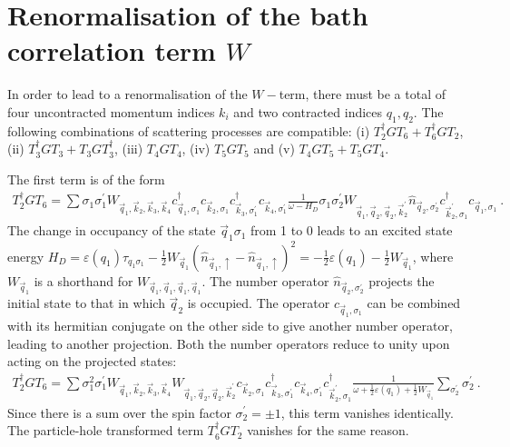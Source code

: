 \documentclass{revtex4-2}
\begin{document}
\section{Renormalisation of the bath correlation term \(W\)}
In order to lead to a renormalisation of the \(W-\)term, there must be a total of four uncontracted momentum indices \(k_i\) and two contracted indices \(q_1, q_2\). The following combinations of scattering processes are compatible: (i) \(T_2^\dagger G T_6 + T_6^\dagger G T_2\), (ii) \(T_3^\dagger G T_3 + T_3 G T_3^\dagger\), (iii) \(T_4 G T_4\), (iv) \(T_5 G T_5\) and (v) \(T_4 G T_5 + T_5 G T_4\).

The first term is of the form
\begin{equation}\begin{aligned}
	T_2^\dagger G T_6 = \sum \sigma_1\sigma_1^\prime W_{\vec q_1,\vec k_2,\vec k_3,\vec k_4} c^\dagger_{\vec q_1, \sigma_1}c_{\vec k_2,\sigma_1}c^\dagger_{\vec k_3,\sigma_1^\prime}c_{\vec k_4,\sigma_1^\prime} \frac{1}{\omega - H_D}\sigma_1\sigma_2^\prime W_{\vec q_1,\vec q_2,\vec q_2,\vec k_2^\prime} \hat n_{\vec q_2,\sigma_2^\prime}c^\dagger_{\vec k_2^\prime,\sigma_1}c_{\vec q_1,\sigma_1}~.
\end{aligned}\end{equation}
The change in occupancy of the state \(\vec q_1\sigma_1\) from 1 to 0 leads to an excited state energy \(H_D = \varepsilon(q_1)\tau_{q_1\sigma_1} - \frac{1}{2}W_{\vec q_1}\left(\hat n_{\vec q_1, \uparrow} - \hat n_{\vec q_1, \uparrow}\right)^2 = -\frac{1}{2}\varepsilon(q_1) - \frac{1}{2}W_{\vec q_1}\), where \(W_{\vec q_1}\) is a shorthand for \(W_{\vec q_1,\vec q_1,\vec q_1,\vec q_1}\). The number operator \(\hat n_{\vec q_2,\sigma_2^\prime}\) projects the initial state to that in which \(\vec q_2\) is occupied. The operator \(c_{\vec q_1,\sigma_1}\) can be combined with its hermitian conjugate on the other side to give another number operator, leading to another projection. Both the number operators reduce to unity upon acting on the projected states:
\begin{equation}\begin{aligned}
	T_2^\dagger G T_6 = \sum \sigma_1^2\sigma_1^\prime W_{\vec q_1,\vec k_2,\vec k_3,\vec k_4} W_{\vec q_1,\vec q_2,\vec q_2,\vec k_2^\prime} c_{\vec k_2,\sigma_1}c^\dagger_{\vec k_3,\sigma_1^\prime}c_{\vec k_4,\sigma_1^\prime} c^\dagger_{\vec k_2^\prime,\sigma_1}\frac{1}{\omega + \frac{1}{2}\varepsilon(q_1) + \frac{1}{2}W_{\vec q_1}}\sum_{\sigma_2^\prime}\sigma_2^\prime  ~.
\end{aligned}\end{equation}
Since there is a sum over the spin factor \(\sigma_2^\prime = \pm 1\), this term vanishes identically. The particle-hole transformed term \(T_6^\dagger G T_2\) vanishes for the same reason.
\end{document}
